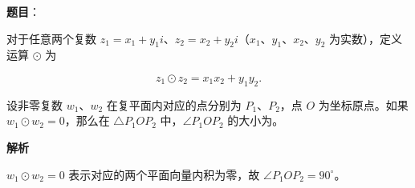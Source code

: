 \begin{answer}

\textbf{题目}：

对于任意两个复数 $z_1=x_1+y_1i$、$z_2=x_2+y_2i$（$x_1\text{、}y_1\text{、}x_2\text{、}y_2$ 为实数），定义运算 $\odot$ 为

\nopagebreak[4]
\[
z_1\odot z_2=x_1x_2+y_1y_2.
\]

设非零复数 $w_1\text{、}w_2$ 在复平面内对应的点分别为 $P_1\text{、}P_2$，点 $O$ 为坐标原点。如果 $w_1\odot w_2=0$，那么在 $\triangle P_1OP_2$ 中，$\angle P_1OP_2$ 的大小为\gkblank{}。

\textbf{解析}

$w_1\odot w_2=0$ 表示对应的两个平面向量内积为零，故 $\angle P_1OP_2=90^\circ$。


\end{answer}

